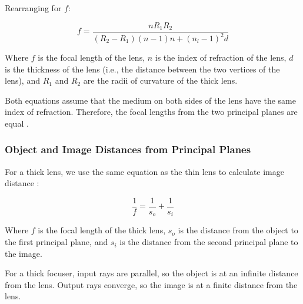 \hspace{8pt} Rearranging for $f$:

\begin{equation}
    f = \frac{n R_1 R_2}{(R_2-R_1)(n-1)n + (n_l-1)^2 d}
\end{equation}




Where $f$ is the focal length of the lens, $n$ is the index of refraction of the lens, $d$ is the thickness of the lens (i.e., the distance between the two vertices of the lens), and $R_1$ and $R_2$ are the radii of curvature of the thick lens. 

Both equations assume that the medium on both sides of the lens have the same index of refraction. Therefore, the focal lengths from the two principal planes are equal \cite{Serbanescu2013}.

\subsubsection{Object and Image Distances from Principal Planes}

For a thick lens, we use the same equation as the thin lens to calculate image distance \cite{Jones2013}:

\begin{equation} \label{eq:thick-object-image-dists}
    \frac{1}{f} = \frac{1}{s_o} + \frac{1}{s_i}
\end{equation}

Where $f$ is the focal length of the thick lens, $s_o$ is the distance from the object to the first principal plane, and $s_i$ is the distance from the second principal plane to the image.

For a thick focuser, input rays are parallel, so the object is at an infinite distance from the lens. Output rays converge, so the image is at a finite distance from the lens. 

